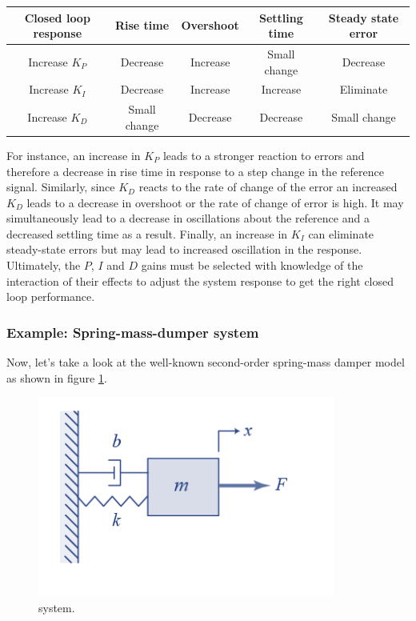 \begin{center}
 \begin{tabular}{||c c c c c ||} 
 \hline
 Closed loop response & Rise time & Overshoot &  Settling time & Steady state error  \\ [0.5ex] 
 \hline\hline
 Increase $K_P$ & Decrease & Increase & Small change & Decrease  \\ 
 \hline
 Increase $K_I$  & Decrease & Increase & Increase & Eliminate \\
 \hline
 Increase $K_D$ & Small change & Decrease & Decrease & Small change  \\ [1ex] 
 \hline
\end{tabular}
\end{center}

For instance, an increase in $K_P$ leads to a stronger reaction to errors and therefore a decrease in rise time in response to a step change in the reference signal. Similarly, since $K_D$ reacts to the rate of change of the error an increased $K_D$ leads to a decrease in overshoot or the rate of change of error is high. It may simultaneously lead to a decrease in oscillations about the reference and a decreased settling time as a result. Finally, an increase in $K_I$ can eliminate steady-state errors but may lead to increased oscillation in the response. Ultimately, the $P$, $I$ and $D$ gains must be selected with knowledge of the interaction of their effects to adjust the system response to get the right closed loop performance. 

\subsubsection{Example: Spring-mass-dumper system}
Now, let's take a look at the well-known second-order spring-mass damper model as shown in figure \ref{spring_mass_damper_system}. 

\begin{figure}[!htb]
\begin{center}
\includegraphics[scale=0.380]{img/longitudinal_control/spring_mass_damper_system.jpeg}
\end{center}
\caption{ system.}
\label{spring_mass_damper_system}
\end{figure}

